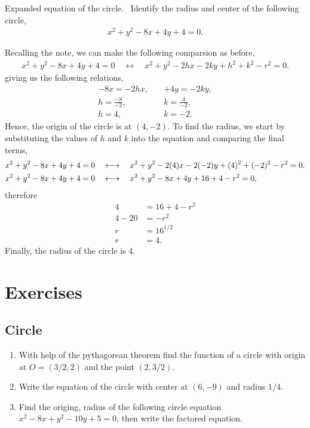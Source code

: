 \documentclass[../main-exe.tex]{subfiles}
\begin{document}
\begin{example}{Expanded equation of the circle.}{~}
    Identify the radius and center of the following circle,
    \begin{gather*}
        x^2 + y^2 -8x +4y +4 = 0. 
    \end{gather*}

    Recalling the note, we can make the following comparsion as before,
    \begin{gather*}
        x^2 + y^2 -8x +4y +4 = 0\quad\longleftrightarrow\quad x^2 + y^2 -2hx -2ky + h^2 + k^2 -r^2 = 0.
    \end{gather*}
    giving us the following relations,
    \begin{align*}
        -8x = -2hx,\quad & +4y = -2ky, \\
        h = \frac{-8}{-2},\quad & k = \frac{4}{-2}, \\
        h = 4,\quad & k = -2.
    \end{align*}
    Hence, the origin of the circle is at $(4,-2)$.
    To find the radius, we start by substituting the values of $h$ and $k$ into the equation and comparing the final terms,
    \begin{align*}
        x^2 + y^2 -8x +4y +4 = 0\quad&\longleftrightarrow\quad x^2 + y^2 -2\qty(4)x -2\qty(-2)y + (4)^2 + (-2)^2 -r^2 = 0. \\
        x^2 + y^2 -8x +4y +4 = 0\quad&\longleftrightarrow\quad x^2 + y^2 -8x +4y + 16 + 4 -r^2 = 0,
    \end{align*}
    therefore
    \begin{align*}
        4 &= 16 + 4 -r^2 \\
        4 - 20 &= -r^2 \\
        r &= 16^{1/2} \\
        r &= 4.
    \end{align*}
    Finally, the radius of the circle is 4.

\end{example}



\section{Exercises}

\subsection{Circle}
\begin{enumerate}
    \item With help of the pythagorean theorem find the function of a circle with origin at $O=(3/2,2)$ and the point $(2,3/2)$.
    \item Write the equation of the circle with center at $(6,-9)$ and radius $1/4$.
    \item Find the origing, radius of the following circle equation $x^2-8x+y^2-10y+5=0$, then write the factored equation.
\end{enumerate}
\end{document}
